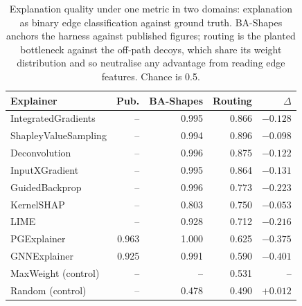 \begin{table}[t]
\centering
\small
\caption{Explanation quality under one metric in two domains: explanation as binary edge classification against ground truth. BA-Shapes anchors the harness against published figures; routing is the planted bottleneck against the off-path decoys, which share its weight distribution and so neutralise any advantage from reading edge features. Chance is 0.5.}
\label{tab:transfer}
\begin{tabular}{lrrrr}
\toprule
Explainer & Pub. & BA-Shapes & Routing & $\Delta$ \\
\midrule
IntegratedGradients & -- & 0.995 & 0.866 & $-0.128$ \\
ShapleyValueSampling & -- & 0.994 & 0.896 & $-0.098$ \\
Deconvolution & -- & 0.996 & 0.875 & $-0.122$ \\
InputXGradient & -- & 0.995 & 0.864 & $-0.131$ \\
GuidedBackprop & -- & 0.996 & 0.773 & $-0.223$ \\
KernelSHAP & -- & 0.803 & 0.750 & $-0.053$ \\
LIME & -- & 0.928 & 0.712 & $-0.216$ \\
\midrule
PGExplainer & 0.963 & 1.000 & 0.625 & $-0.375$ \\
GNNExplainer & 0.925 & 0.991 & 0.590 & $-0.401$ \\
\midrule
MaxWeight (control) & -- & -- & 0.531 & -- \\
Random (control) & -- & 0.478 & 0.490 & $+0.012$ \\
\bottomrule
\end{tabular}
\end{table}

